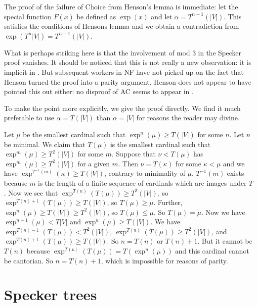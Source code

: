 \documentclass[12pt]{article}
\begin{document}
The proof of the failure of Choice from Henson's lemma is immediate:  let the special function $F(x)$ be defined as $\exp(x)$ and let $\alpha=T^{n-1}(|V|)$.  This satisfies the conditions of Hensons lemma and we obtain a contradiction from
$\exp(T^{n}|V|)=T^{n-1}(|V|)$.

What is perhaps striking here is that the involvement of mod 3 in the Specker proof vanishes.  It should be noticed that this is not really a new observation: it is implicit in \cite{henson}.  But subsequent workers in NF have not picked up on the fact that Henson turned the proof into a parity argument.  Henson does not appear to have pointed this out either:  no disproof of AC seems to appear in \cite{henson}.

To make the point more explicitly, we give the proof directly.  We find it much preferable to use $\alpha=T(|V|)$ than $\alpha=|V|$ for reasons the reader may divine.

Let $\mu$ be the smallest cardinal such that $\exp^n(\mu)\geq T(|V|)$ for some $n$.  Let $n$ be minimal.
We claim that $T(\mu)$ is the smallest cardinal such that $\exp^m(\mu) \geq T^2(|V|)$ for some $m$.  Suppose
that $\nu < T(\mu)$ has $\exp^m(\mu) \geq T^2(|V|)$ for a given $m$.  Then $\nu = T(\kappa)$ for some $\kappa<\mu$
and we have $\exp^{T^{-1}(m)}(\kappa) \geq T(|V|)$, contrary to minimality of $\mu$.  $T^{-1}(m)$ exists because
$m$ is the length of a finite sequence of cardinals which are images under $T$.   Now we see that
$\exp^{T(n)}(T(\mu))\geq T^2(|V|)$, so $\exp^{T(n)+1}(T(\mu))\geq T(|V|)$, so $T(\mu)\geq \mu$.
Further, $\exp^n(\mu)\geq T(|V|)\geq T^2(|V|)$, so $T(\mu) \leq \mu$.   So $T(\mu)=\mu$.  Now
we have $\exp^{n-1}(\mu)<T|V|$ and $\exp^n(\mu)\geq T(|V|)$.  We have $\exp^{T(n)-1}(T(\mu)) < T^2(|V|)$,
$\exp^{T(n)}(T(\mu)) \geq T^2(|V|)$, and $\exp^{T(n)+1}(T(\mu)) \geq T(|V|)$.  So $n=T(n)$ or $T(n)+1$.
But it cannot be $T(n)$ because $\exp^{T(n)}(T(\mu))=T(\exp^n(\mu))$ and this cardinal cannot be cantorian.
So $n=T(n)+1$, which is impossible for reasons of parity.


\section{Specker trees}
\end{document}
